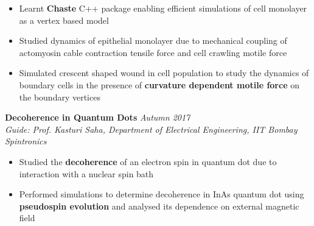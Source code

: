 \documentclass[10pt]{article}%
\newcommand{\xfilll}[2][1ex]{
\dimen0=#2\advance\dimen0 by #1
\leaders\hrule height \dimen0 depth -#1\hfill}
\begin{document}
{\begin{itemize}
    \setlength\itemsep{0.01em}
    \item Learnt \textbf{Chaste} C++ package enabling efficient simulations of cell monolayer as a vertex based model
    \item Studied dynamics of epithelial monolayer due to mechanical coupling of actomyosin cable contraction tensile force and cell crawling motile force
    \item Simulated crescent shaped wound in cell population to study the dynamics of boundary cells in the presence of \textbf{curvature dependent motile force} on the boundary vertices
\end{itemize}






\vspace{-2mm}
{\flushleft \bf \large{Decoherence in Quantum Dots}}  \hfill \textit{Autumn 2017} \\
{\em Guide: Prof. Kasturi Saha, Department of Electrical Engineering, IIT Bombay \hfill Spintronics}
\vspace{-1.5mm}
\begin{itemize}
\setlength\itemsep{0.01em}
    \item   Studied the \textbf{decoherence} of an electron spin in quantum dot due to interaction with a nuclear spin bath
    \item   Performed simulations to determine decoherence in InAs quantum dot using \textbf{pseudospin evolution} and analysed its dependence on external magnetic field 
\end{itemize}

}
\end{document}
